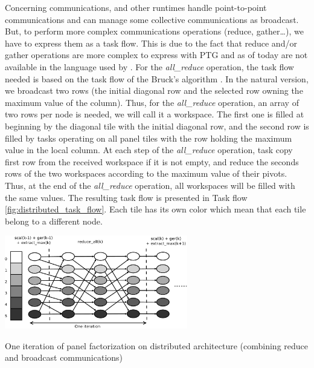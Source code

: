 Concerning communications, \dague and other runtimes handle point-to-point communications and can manage some collective communications as broadcast. But, to perform more complex communications operations (reduce, gather\dots), we have to express them as a task flow. 
This is due to the fact that reduce and/or gather operations are more complex to express with PTG and as of today are not available in the language used by \dague. For the \emph{all\_reduce} operation, the task flow needed is based on the task flow of the Bruck's algorithm \cite{BruckEtAl97}.
In the natural version, we broadcast two rows (the initial diagonal row and the selected row owning the maximum value of the column). Thus, for the \emph{all\_reduce} operation, an array of two rows per node is needed, we will call it a workspace. The first one is filled at beginning by the diagonal tile with the initial diagonal row, and the second row is filled by tasks operating on all panel tiles with the row holding the maximum value in the local column. At each step of the \textit{all\_reduce} operation, task copy first row from the received workspace if it is not empty, and reduce the seconds rows of the two workspaces according to the maximum value of their pivots. Thus, at the end of the \textit{all\_reduce} operation, all workspaces will be filled with the same values.
The resulting task flow is presented in Task flow \ref{fig:distributed_task_flow}. Each tile has its own color which mean that each tile belong to a different node. 

\begin{taskflow}[!ht]
\centering
\includegraphics[width=0.6\textwidth]{figures/distributed_tf_bw.pdf}
\caption{One iteration of panel factorization on distributed architecture (combining reduce and broadcast communications)\label{fig:distributed_task_flow}}

\end{taskflow}

